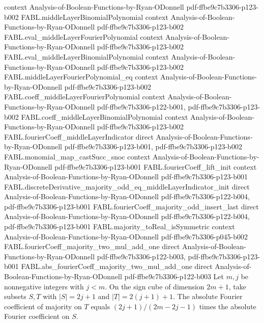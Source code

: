 \begin{theorem}
  {context}
  {Analysis-of-Boolean-Functions-by-Ryan-ODonnell}
  {pdf-ffbe9c7b3306-p123-b002}
\proofstep
  {FABL.middleLayerBinomialPolynomial}
  {context}
  {Analysis-of-Boolean-Functions-by-Ryan-ODonnell}
  {pdf-ffbe9c7b3306-p123-b002}
\proofstep
  {FABL.eval_middleLayerFourierPolynomial}
  {context}
  {Analysis-of-Boolean-Functions-by-Ryan-ODonnell}
  {pdf-ffbe9c7b3306-p123-b002}
\proofstep
  {FABL.eval_middleLayerBinomialPolynomial}
  {context}
  {Analysis-of-Boolean-Functions-by-Ryan-ODonnell}
  {pdf-ffbe9c7b3306-p123-b002}
\proofstep
  {FABL.middleLayerFourierPolynomial_eq}
  {context}
  {Analysis-of-Boolean-Functions-by-Ryan-ODonnell}
  {pdf-ffbe9c7b3306-p123-b002}
\proofstep
  {FABL.coeff_middleLayerFourierPolynomial}
  {context}
  {Analysis-of-Boolean-Functions-by-Ryan-ODonnell}
  {pdf-ffbe9c7b3306-p122-b001,
    pdf-ffbe9c7b3306-p123-b002}
\proofstep
  {FABL.coeff_middleLayerBinomialPolynomial}
  {context}
  {Analysis-of-Boolean-Functions-by-Ryan-ODonnell}
  {pdf-ffbe9c7b3306-p123-b002}
\proofstep
  {FABL.fourierCoeff_middleLayerIndicator}
  {direct}
  {Analysis-of-Boolean-Functions-by-Ryan-ODonnell}
  {pdf-ffbe9c7b3306-p123-b001,
    pdf-ffbe9c7b3306-p123-b002}
\proofstep
  {FABL.monomial_map_castSucc_snoc}
  {context}
  {Analysis-of-Boolean-Functions-by-Ryan-ODonnell}
  {pdf-ffbe9c7b3306-p123-b001}
\proofstep
  {FABL.fourierCoeff_lift_init}
  {context}
  {Analysis-of-Boolean-Functions-by-Ryan-ODonnell}
  {pdf-ffbe9c7b3306-p123-b001}
\proofstep
  {FABL.discreteDerivative_majority_odd_eq_middleLayerIndicator_init}
  {direct}
  {Analysis-of-Boolean-Functions-by-Ryan-ODonnell}
  {pdf-ffbe9c7b3306-p122-b004,
    pdf-ffbe9c7b3306-p123-b001}
\proofstep
  {FABL.fourierCoeff_majority_odd_insert_last}
  {direct}
  {Analysis-of-Boolean-Functions-by-Ryan-ODonnell}
  {pdf-ffbe9c7b3306-p122-b004,
    pdf-ffbe9c7b3306-p123-b001}
\proofstep
  {FABL.majority_toReal_isSymmetric}
  {context}
  {Analysis-of-Boolean-Functions-by-Ryan-ODonnell}
  {pdf-ffbe9c7b3306-p045-b002}
\proofstep
  {FABL.fourierCoeff_majority_two_mul_add_one}
  {direct}
  {Analysis-of-Boolean-Functions-by-Ryan-ODonnell}
  {pdf-ffbe9c7b3306-p122-b003,
    pdf-ffbe9c7b3306-p123-b001}
\proofstep
  {FABL.abs_fourierCoeff_majority_two_mul_add_one}
  {direct}
  {Analysis-of-Boolean-Functions-by-Ryan-ODonnell}
  {pdf-ffbe9c7b3306-p122-b003}
Let $m,j$ be nonnegative integers with $j<m$. On the sign cube of dimension $2m+1$, take
subsets $S,T$ with $|S|=2j+1$ and $|T|=2(j+1)+1$. The absolute Fourier coefficient of
majority on $T$ equals $(2j+1)/(2m-2j-1)$ times the absolute Fourier coefficient on $S$.
\end{theorem}

